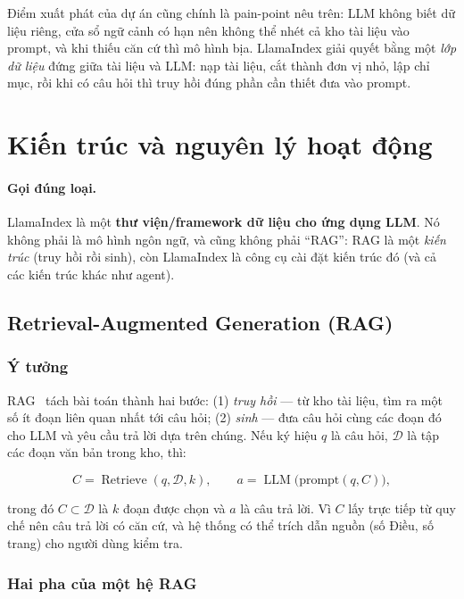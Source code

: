 Điểm xuất phát của dự án cũng chính là pain-point nêu trên: LLM không biết dữ liệu riêng, cửa sổ ngữ
cảnh có hạn nên không thể nhét cả kho tài liệu vào prompt, và khi thiếu căn cứ thì mô hình bịa. LlamaIndex
giải quyết bằng một \emph{lớp dữ liệu} đứng giữa tài liệu và LLM: nạp tài liệu, cắt thành đơn vị nhỏ,
lập chỉ mục, rồi khi có câu hỏi thì truy hồi đúng phần cần thiết đưa vào prompt.

\section{Kiến trúc và nguyên lý hoạt động}

\paragraph{Gọi đúng loại.} LlamaIndex là một \textbf{thư viện/framework dữ liệu cho ứng dụng LLM}.
Nó không phải là mô hình ngôn ngữ, và cũng không phải ``RAG'': RAG là một \emph{kiến trúc} (truy hồi rồi
sinh), còn LlamaIndex là công cụ cài đặt kiến trúc đó (và cả các kiến trúc khác như agent).

\subsection{Retrieval-Augmented Generation (RAG)}

\subsubsection{Ý tưởng}

RAG~\cite{lewis2020rag,gao2023ragsurvey} tách bài toán thành hai bước: (1) \emph{truy hồi} --- từ kho tài liệu, tìm ra một số ít đoạn liên quan nhất tới câu hỏi; (2) \emph{sinh} --- đưa câu hỏi cùng các đoạn đó cho LLM và yêu cầu trả lời dựa trên chúng. Nếu ký hiệu $q$ là câu hỏi, $\mathcal{D}$ là tập các đoạn văn bản trong kho, thì:

\begin{equation}
  C = \operatorname{Retrieve}(q, \mathcal{D}, k), \qquad
  a = \operatorname{LLM}\big(\text{prompt}(q, C)\big),
\end{equation}

trong đó $C \subset \mathcal{D}$ là $k$ đoạn được chọn và $a$ là câu trả lời. Vì $C$ lấy trực tiếp từ quy chế nên câu trả lời có căn cứ, và hệ thống có thể trích dẫn nguồn (số Điều, số trang) cho người dùng kiểm tra.

\subsubsection{Hai pha của một hệ RAG}

